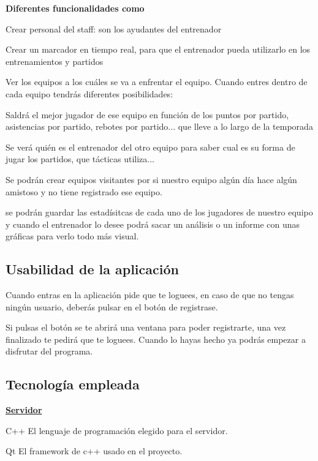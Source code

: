 {\bfseries Diferentes funcionalidades como}
\begin{DoxyItemize}
\item Crear personal del staff\+: son los ayudantes del entrenador
\item Crear un marcador en tiempo real, para que el entrenador pueda utilizarlo en los entrenamientos y partidos
\item Ver los equipos a los cuáles se va a enfrentar el equipo. Cuando entres dentro de cada equipo tendrás diferentes posibilidades\+:
\begin{DoxyEnumerate}
\item Saldrá el mejor jugador de ese equipo en función de los puntos por partido, asistencias por partido, rebotes por partido... que lleve a lo largo de la temporada
\item Se verá quién es el entrenador del otro equipo para saber cual es su forma de jugar los partidos, que tácticas utiliza...
\end{DoxyEnumerate}
\item Se podrán crear equipos visitantes por si nuestro equipo algún día hace algún amistoso y no tiene registrado ese equipo.
\item se podrán guardar las estadísitcas de cada uno de los jugadores de nuestro equipo y cuando el entrenador lo desee podrá sacar un análisis o un informe con unas gráficas para verlo todo más visual.
\end{DoxyItemize}

\subsection*{Usabilidad de la aplicación}


\begin{DoxyItemize}
\item Cuando entras en la aplicación pide que te loguees, en caso de que no tengas ningún usuario, deberás pulsar en el botón de registrase.
\item Si pulsas el botón se te abrirá una ventana para poder registrarte, una vez finalizado te pedirá que te loguees. Cuando lo hayas hecho ya podrás empezar a disfrutar del programa.
\end{DoxyItemize}

\subsection*{Tecnología empleada}

{\bfseries \mbox{\hyperlink{classServidor}{Servidor}}}
\begin{DoxyItemize}
\item C++ El lenguaje de programación elegido para el servidor.
\item Qt El framework de c++ usado en el proyecto.
\end{DoxyItemize}

